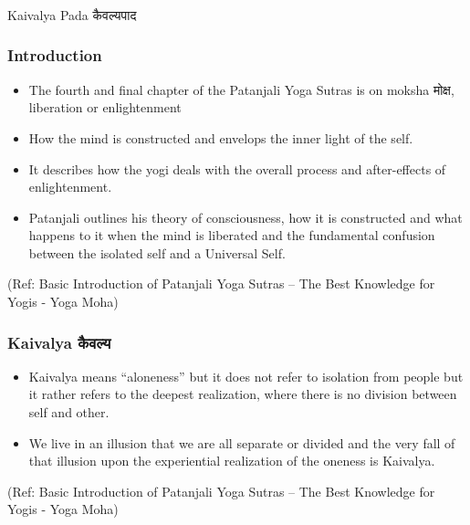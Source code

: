 \begin{frame}[fragile]\frametitle{}
\begin{center}
{\Large Kaivalya Pada कैवल्यपाद}
\end{center}
\end{frame}



\begin{frame}[fragile]\frametitle{Introduction}


	\begin{itemize}
	\item The fourth and final chapter of the Patanjali Yoga Sutras is on moksha मोक्ष, liberation or enlightenment
	\item How the mind is constructed and envelops the inner light of the self. 
	\item It describes how the yogi deals with the overall process and after-effects of enlightenment. 	\item Patanjali outlines his theory of consciousness, how it is constructed and what happens to it when the mind is liberated and the fundamental confusion between the isolated self and a Universal Self.
	\end{itemize}

\tiny{(Ref: Basic Introduction of Patanjali Yoga Sutras – The Best Knowledge for Yogis - Yoga Moha)}

\end{frame}

\begin{frame}[fragile]\frametitle{Kaivalya कैवल्य}


	\begin{itemize}
	\item Kaivalya means ``aloneness'' but it does not refer to isolation from people but it rather refers to the deepest realization, where there is no division between self and other.
	\item We live in an illusion that we are all separate or divided and the very fall of that illusion upon the experiential realization of the oneness is Kaivalya.
	\end{itemize}

\tiny{(Ref: Basic Introduction of Patanjali Yoga Sutras – The Best Knowledge for Yogis - Yoga Moha)}

\end{frame}

